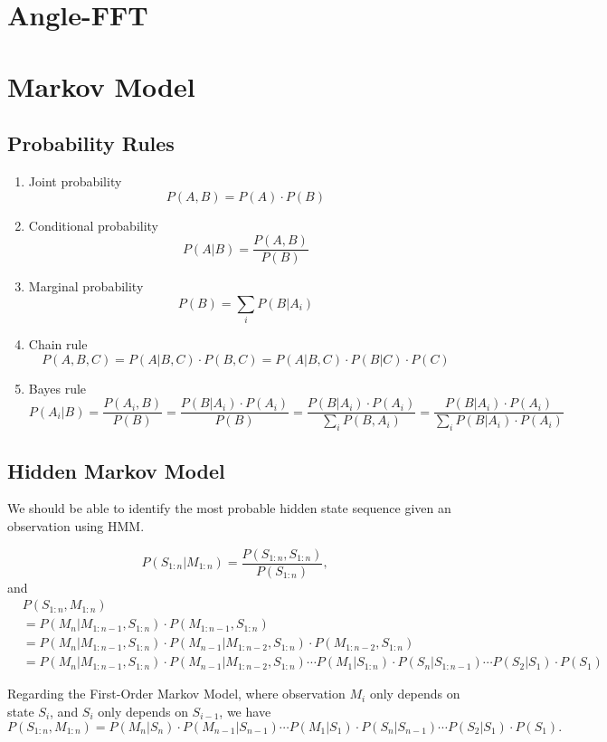 \documentclass[11pt, oneside]{article}   	%
\begin{document}
\section{Angle-FFT}

\section{Markov Model}
\subsection{Probability Rules}
\begin{enumerate}
\item Joint probability 
$$P(A, B) = P(A)\cdot P(B)$$

\item Conditional probability 
$$P(A | B) = \frac{P(A, B)}{P(B)}$$

\item Marginal probability 
$$P(B) = \sum_{i} P(B | A_i) $$

\item Chain rule
$$P(A, B, C) = P(A | B, C)\cdot P(B, C) = P(A | B, C)\cdot P(B | C)\cdot P(C)$$

\item Bayes rule
$$P(A_i | B) = \frac{P(A_i, B)}{P(B)} = \frac{P(B | A_i)\cdot P(A_i)}{P(B)} = \frac{P(B | A_i)\cdot P(A_i)}{\sum_{i}P(B, A_i)} =  \frac{P(B | A_i)\cdot P(A_i)}{\sum_{i}P(B | A_i)\cdot P(A_i)}$$
\end{enumerate}

\subsection{Hidden Markov Model}
We should be able to identify the most probable hidden state sequence given an observation using HMM.

$$P(S_{1:n} | M_{1:n}) = \frac{P(S_{1:n}, S_{1:n})}{P(S_{1:n})},$$
and 
\begin{align*}
&P(S_{1:n}, M_{1:n})\\
& = P(M_n|M_{1:n-1}, S_{1:n})\cdot P(M_{1:n-1}, S_{1:n})\\
& = P(M_n|M_{1:n-1}, S_{1:n})\cdot P(M_{n-1}|M_{1:n-2}, S_{1:n})\cdot P(M_{1:n-2}, S_{1:n})\\
& = P(M_n|M_{1:n-1}, S_{1:n})\cdot P(M_{n-1}|M_{1:n-2}, S_{1:n})\cdots P(M_1|S_{1:n})\cdot P(S_n|S_{1:n-1})\cdots P(S_2|S_1)\cdot P(S_1)
\end{align*}

Regarding the First-Order Markov Model, where observation $M_i$ only depends on state $S_i$, and  $S_i$ only depends on $S_{i-1}$, we have
$$P(S_{1:n}, M_{1:n})  = P(M_n|S_n)\cdot P(M_{n-1}|S_{n-1})\cdots P(M_1|S_1)\cdot P(S_n|S_{n-1})\cdots P(S_2|S_1)\cdot P(S_1).$$
\end{document}
